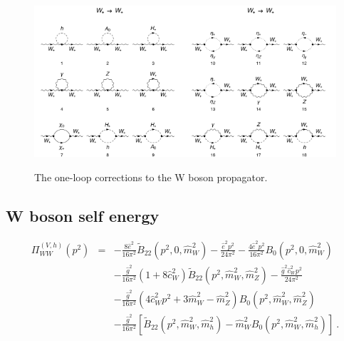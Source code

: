 \documentclass[11pt]{article}
\begin{document}
\begin{figure}[h!]
\center
\includegraphics[width=0.5\textwidth]{diagrams_V[3]_1_1.pdf}\includegraphics[width=0.5\textwidth]{diagrams_V[3]_1_2.pdf}
\caption{The one-loop corrections to the W boson propagator.}\label{fig:gammagamma}
\end{figure}

\subsection{W boson self energy}


{\small
\begin{eqnarray}
\Pi_{WW}^{(V, h)}(p^2) &=&
-\frac{8\hat{e}^2}{16\pi^2} \tilde B_{22}(p^2, 0, \hat{m}_W^2)
-\frac{\hat{e}^2 p^2}{24\pi^2}
-\frac{4\hat{e}^2 p^2}{16\pi^2} B_0(p^2, 0, \hat{m}_W^2) \nonumber \\
&& -\frac{\hat{g}^2}{16\pi^2}(1 + 8\hat{c}_W^2)
\tilde{B}_{22}(p^2, \hat{m}_W^2, \hat{m}_Z^2)
-\frac{\hat{g}^2 \hat{c}_W^2 p^2}{24\pi^2} \nonumber \\
&& -\frac{\hat g^2}{16\pi^2}( 4 \hat c_W^2 p^2 + 3 \hat m_W^2 - \hat m_Z^2) B_0( p^2, \hat m_W^2, \hat m_Z^2) \nonumber\\
&& -\frac{\hat{g}^2}{16\pi^2}
[ \tilde{B}_{22}(p^2, \hat{m}_W^2, \hat{m}_h^2)
-\hat{m}_W^2 B_0(p^2, \hat{m}_W^2, \hat{m}_h^2) ]\ .\label{eq:vhloop2}
\end{eqnarray}
}
\end{document}
